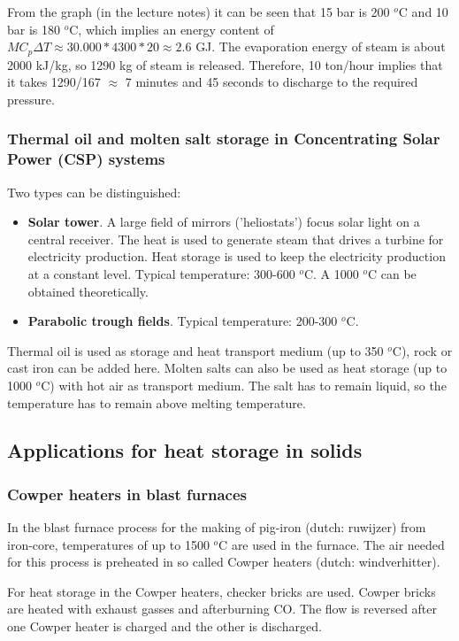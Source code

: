 \documentclass[a4paper,10pt]{article}
\begin{document}
From the graph (in the lecture notes) it can be seen that 15 bar is 200 $^o$C and 10 bar is 180 $^o$C, which implies an energy content of $MC_p \Delta T \approx 30.000*4300*20 \approx 2.6$ GJ. The evaporation energy of steam is about 2000 kJ/kg, so 1290 kg of steam is released. Therefore, 10 ton/hour implies that it takes 1290/167 $\approx$ 7 minutes and 45 seconds to discharge to the required pressure.

\subsubsection{Thermal oil and molten salt storage in Concentrating Solar Power (CSP) systems}
Two types can be distinguished:
\begin{itemize}
 \item \textbf{Solar tower}. A large field of mirrors ('heliostats') focus solar light on a central receiver. The heat is used to generate steam that drives a turbine for electricity production. Heat storage is used to keep the electricity production at a constant level. Typical temperature: 300-600 $^o$C. A 1000 $^o$C can be obtained theoretically.
 \item \textbf{Parabolic trough fields}. Typical temperature: 200-300 $^o$C.
\end{itemize}

Thermal oil is used as storage and heat transport medium (up to 350 $^o$C), rock or cast iron can be added here. Molten salts can also be used as heat storage (up to 1000 $^o$C) with hot air as transport medium. The salt has to remain liquid, so the temperature has to remain above melting temperature.

\subsection{Applications for heat storage in solids}

\subsubsection{Cowper heaters in blast furnaces}
In the blast furnace process for the making of pig-iron (dutch: ruwijzer) from iron-core, temperatures of up to 1500 $^o$C are used in the furnace. The air needed for this process is preheated in so called Cowper heaters (dutch: windverhitter). \bigskip

For heat storage in the Cowper heaters, checker bricks are used. Cowper bricks are heated with exhaust gasses and afterburning CO. The flow is reversed after one Cowper heater is charged and the other is discharged.
\end{document}
